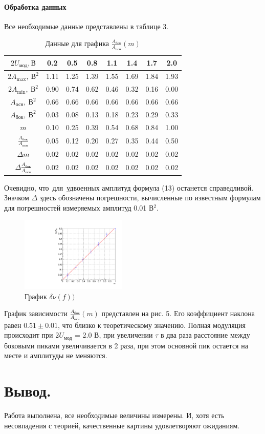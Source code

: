 \documentclass[12pt,a4paper]{article}
\begin{document}
\paragraph{Обработка данных} Все необходимые данные представлены в таблице 3.
\begin{table}[h!]\centering
\begin{tabular}[ht]{|*{8}{c|}}
\hline
$2U_\text{мод}, \text{В}$&0.2&0.5&0.8&1.1&1.4&1.7&2.0\\
\hline
$2A_\text{max},~\text{В}^2$&1.11&1.25&1.39&1.55&1.69&1.84&1.93\\
\hline
$2A_\text{min},~\text{В}^2$&0.90&0.74&0.62&0.46&0.32&0.16&0.00\\
\hline
$A_\text{осн},~\text{В}^2$&0.66&0.66&0.66&0.66&0.66&0.66&0.66\\
\hline
$A_\text{бок},~\text{В}^2$&0.03&0.08&0.13&0.18&0.23&0.29&0.33\\
\hline
$m$&0.10&0.25&0.39&0.54&0.68&0.84&1.00\\
\hline
$\frac{A_\text{бок}}{A_\text{осн}}$&0.05&0.12&0.20&0.27&0.35&0.44&0.50\\
\hline
$\Delta m$&0.02&0.02&0.02&0.02&0.02&0.02&0.02\\
\hline
$\Delta\frac{A_\text{бок}}{A_\text{осн}}$&0.02&0.02&0.02&0.02&0.02&0.02&0.02\\
\hline
\end{tabular}
\caption{Данные для графика $\frac{A_\text{бок}}{A_\text{осн}}(m)$}
\end{table}
Очевидно, что~для~удвоенных амплитуд формула (13) останется справедливой. Значком $\Delta$ здесь обозначены погрешности, вычисленные по известным формулам для погрешностей измеряемых амплитуд 0.01 В$^2$.
\newpage
\begin{figure}
\centering\includegraphics[width = 0.45\textwidth]{Plot5}
\captionsetup{justification = centering}
\caption{График $\delta\nu(f))$ \label{Plot5}}
\vspace{-60pt}
\end{figure}

График зависимости $\frac{A_\text{бок}}{A_\text{осн}}(m)$ представлен на рис. 5. Его коэффициент наклона равен $0.51\pm0.01$, что близко к теоретическому значению. Полная модуляция происходит при $2U_\text{мод}$ = 2.0 В, при увеличении $\tau$ в два раза расстояние между боковыми пиками увеличивается в 2 раза, при этом основной пик остается на месте и амплитуды не меняются.
\section{Вывод.} Работа выполнена, все необходимые величины измерены. И, хотя есть несовпадения с теорией, качественные картины удовлетворяют ожиданиям.
\end{document}
